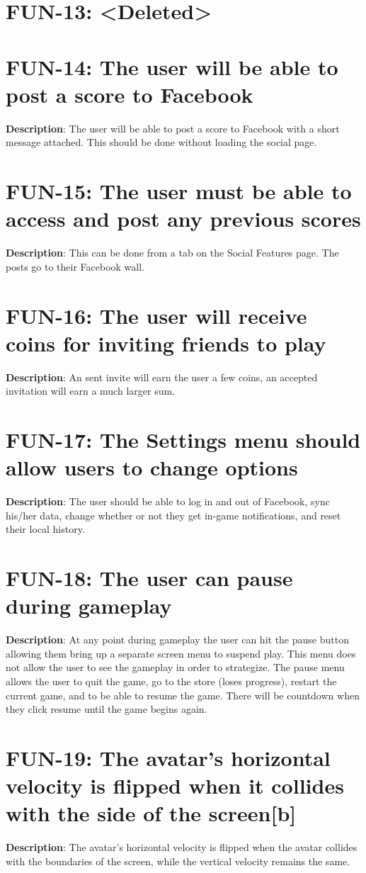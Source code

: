 \section{FUN-13: <Deleted>}
\section{FUN-14: The user will be able to post a score to Facebook}
\textbf{Description}: The user will be able to post a score to Facebook
with a short message attached. This should be done without loading
the social page.
\section{FUN-15: The user must be able to access and post any previous scores}
\textbf{Description}: This can be done from a tab on the Social Features
page. The posts go to their Facebook wall.
\section{FUN-16: The user will receive coins for inviting friends to play}
\textbf{Description}: An sent invite will earn the user a few coins,
an accepted invitation will earn a much larger sum. 
\section{FUN-17: The Settings menu should allow users to change options}
\textbf{Description}: The user should be able to log in and out of
Facebook, sync his/her data, change whether or not they get in-game
notifications, and reset their local history.
\section{FUN-18: The user can pause during gameplay}
\textbf{Description}: At any point during gameplay the user can hit
the pause button allowing them bring up a separate screen menu to
suspend play. This menu does not allow the user to see the gameplay
in order to strategize. The pause menu allows the user to quit the
game, go to the store (loses progress), restart the current game,
and to be able to resume the game. There will be countdown when they
click resume until the game begins again.
\section{FUN-19: The avatar\textquoteright{}s horizontal velocity is flipped
when it collides with the side of the screen{[}b{]}}
\textbf{Description}: The avatar\textquoteright{}s horizontal velocity
is flipped when the avatar collides with the boundaries of the screen,
while the vertical velocity remains the same. 
